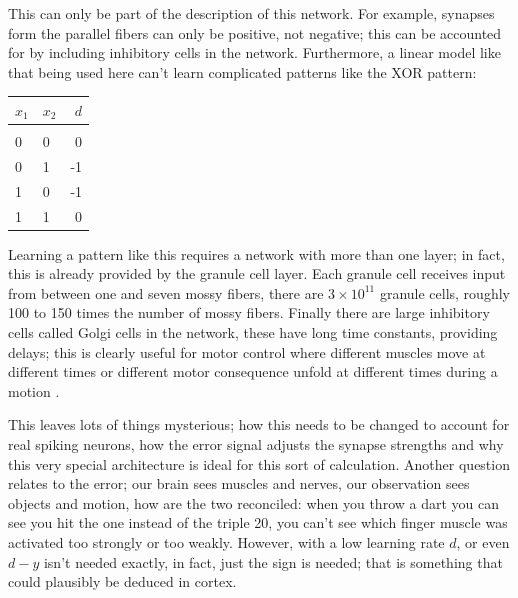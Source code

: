 \documentclass[11pt,a4paper]{scrartcl}
\begin{document}
This can only be part of the description of this network. For example,
synapses form the parallel fibers can only be positive, not negative;
this can be accounted for by including inhibitory cells in the
network. Furthermore, a linear model like that being used here can't learn complicated patterns like the XOR pattern:
\begin{center}
\begin{tabular}{llr}
$x_1$&$x_2$&$d$\\
\hline\\
0&0&0\\
0&1&-1\\
1&0&-1\\
1&1&0
\end{tabular}
\end{center}
Learning a pattern like this requires a network with more than one
layer; in fact, this is already provided by the granule cell
layer. Each granule cell receives input from between one and seven
mossy fibers, there are $3\times 10^{11}$ granule cells, roughly 100
to 150 times the number of mossy fibers. Finally there are large
inhibitory cells called Golgi cells in the network, these have long
time constants, providing delays; this is clearly useful for motor
control where different muscles move at different times or different
motor consequence unfold at different times during a motion \cite{Fujita1982a,ShidaraEtAl1993a}.

This leaves lots of things mysterious; how this needs to be changed to
account for real spiking neurons, how the error signal adjusts the
synapse strengths and why this very special architecture is ideal for
this sort of calculation. Another question relates to the error; our
brain sees muscles and nerves, our observation sees objects and
motion, how are the two reconciled: when you throw a dart you can see
you hit the one instead of the triple 20, you can't see which finger
muscle was activated too strongly or too weakly. However, with a low
learning rate $d$, or even $d-y$ isn't needed exactly, in fact, just
the sign is needed; that is something that could plausibly be deduced in cortex.
\end{document}
